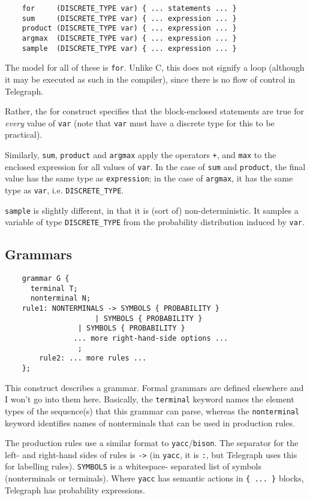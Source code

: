 \documentclass{article}
\begin{document}
\begin{verbatim}
	for     (DISCRETE_TYPE var) { ... statements ... }
	sum     (DISCRETE_TYPE var) { ... expression ... }
	product (DISCRETE_TYPE var) { ... expression ... }
	argmax  (DISCRETE_TYPE var) { ... expression ... }
	sample  (DISCRETE_TYPE var) { ... expression ... }
\end{verbatim}

The model for all of these is {\tt for}. Unlike C, this does not signify a
loop (although it may be executed as such in the compiler), since there is
no flow of control in Telegraph.

Rather, the for construct specifies that the block-enclosed statements are
true for {\em every} value of {\tt var} (note that {\tt var} must have a discrete type for
this to be practical).

Similarly, {\tt sum}, {\tt product} and {\tt argmax} apply the operators {\tt +}, {\tt *} and
{\tt max} to the enclosed expression for all values of {\tt var}. In the case of
{\tt sum} and {\tt product}, the final value has the same type as {\tt expression}; in
the case of {\tt argmax}, it has the same type as {\tt var}, i.e. {\tt DISCRETE\_TYPE}.

{\tt sample} is slightly different, in that it is (sort of) non-deterministic.  
It samples a variable of type {\tt DISCRETE\_TYPE} from the probability
distribution induced by {\tt var}.

\subsection{Grammars}

\begin{verbatim}
	grammar G {
	  terminal T;
	  nonterminal N;
	rule1: NONTERMINALS -> SYMBOLS { PROBABILITY }
		             | SYMBOLS { PROBABILITY }
		  	     | SYMBOLS { PROBABILITY }
			    ... more right-hand-side options ...
			     ;
        rule2: ... more rules ...
	};
\end{verbatim}

This construct describes a grammar. Formal grammars are defined elsewhere
and I won't go into them here. Basically, the {\tt terminal} keyword names the
element types of the sequence(s) that this grammar can parse, whereas the
{\tt nonterminal} keyword identifies names of nonterminals that can be used in
production rules.

The production rules use a similar format to {\tt yacc}/{\tt bison}. The separator for
the left- and right-hand sides of rules is {\tt ->} (in {\tt yacc}, it is {\tt :}, but
Telegraph uses this for labelling rules). {\tt SYMBOLS} is a whitespace-
separated list of symbols (nonterminals or terminals). Where {\tt yacc} has
semantic actions in {\tt \{ ... \}} blocks, Telegraph has probability
expressions.
\end{document}
